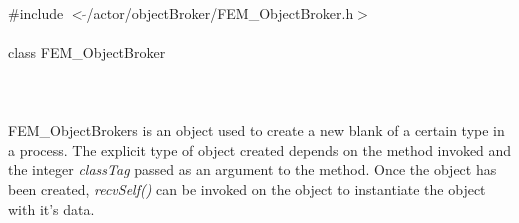 
   \\
\indent \#include $<\tilde{ }$/actor/objectBroker/FEM\_ObjectBroker.h$>$  \\

  \\
\indent class FEM\_ObjectBroker \\

 \\
 \\

  \\
\indent FEM\_ObjectBrokers is an object used to create a new blank 
of a certain type in a process. The explicit type of object
created depends on the method invoked and the integer {\em classTag}
passed as an argument to the method. Once the object has been created, {\em
recvSelf()} can be invoked on the object to instantiate the object
with it's data. \\


